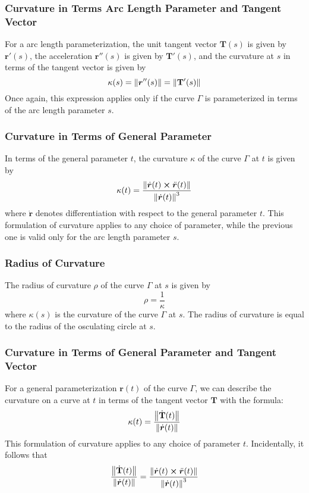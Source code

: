 \documentclass[11pt, a4paper]{article}
\begin{document}
\subsubsection{Curvature in Terms Arc Length Parameter and Tangent Vector}
For a arc length parameterization, the unit tangent vector $ \mathbf{T}(s) $ is given by $ \bm{r}'(s) $, the acceleration $ \bm{r}''(s) $ is given by $ \mathbf{T}'(s) $, and the curvature at $ s $ in terms of the tangent vector is given by
\begin{equation*}
	\kappa(s) = \norm{ \bm{r}''(s)} = \norm{\mathbf{T}'(s)}
\end{equation*}
Once again, this expression applies only if the curve $ \Gamma $ is parameterized in terms of the arc length parameter $ s $.

\subsubsection{Curvature in Terms of General Parameter}
In terms of the general parameter $ t $, the curvature $ \kappa $ of the curve $ \Gamma $ at $ t $ is given by 
\begin{equation*}
	\kappa(t) = \frac{\norm{\dot{\bm{r}}(t) \cross \ddot{\bm{r}}(t)}}{\norm{ \dot{\bm{r}}(t)}^3}
\end{equation*}
where $ \dot{\bm{r}} $ denotes differentiation with respect to the general parameter $ t $. This formulation of curvature applies to any choice of parameter, while the previous one is valid only for the arc length parameter $ s $.
	
\subsubsection{Radius of Curvature}
The radius of curvature $ \rho $ of the curve $ \Gamma $ at $ s $ is given by
\begin{equation*}
	\rho = \frac{1}{\kappa}
\end{equation*}
where $ \kappa (s) $ is the curvature of the curve $ \Gamma $ at $ s $. The radius of curvature is equal to the radius of the osculating circle at $ s $.

	
\subsubsection{Curvature in Terms of General Parameter and Tangent Vector}
For a general parameterization $ \bm{r}(t) $ of the curve $ \Gamma $, we can describe the curvature on a curve at $ t $ in terms of the tangent vector $ \mathbf{T} $ with the formula:
\begin{equation*}
	\kappa(t) = \frac{\norm{\dot{\mathbf{T}}(t)}}{\norm{\dot{\bm{r}}(t)}}
\end{equation*}
This formulation of curvature applies to any choice of parameter $ t $. Incidentally, it follows that
\begin{equation*}
	\frac{\norm{\dot{\mathbf{T}}(t)}}{\norm{\dot{\bm{r}}(t)}} =  \frac{\norm{\dot{\bm{r}}(t) \cross \ddot{\bm{r}}(t)}}{\norm{ \dot{\bm{r}}(t)}^3}
\end{equation*} 
\end{document}
